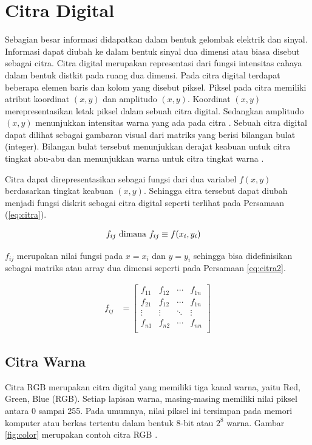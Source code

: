 \section{Citra Digital}
Sebagian besar informasi didapatkan dalam bentuk gelombak elektrik dan sinyal. Informasi dapat diubah ke dalam bentuk sinyal dua dimensi atau biasa disebut sebagai citra. Citra digital merupakan representasi dari fungsi intensitas cahaya dalam bentuk distkit pada ruang dua dimensi. Pada citra digital terdapat beberapa elemen baris dan kolom yang disebut piksel. Piksel pada citra memiliki atribut koordinat $(x,y)$ dan amplitudo $(x,y)$. Koordinat $(x,y)$ merepresentasikan letak piksel dalam sebuah citra digital. Sedangkan amplitudo $(x,y)$ menunjukkan intensitas warna yang ada pada citra \citep{Ratna2020}. Sebuah citra digital dapat dilihat sebagai gambaran visual dari matriks yang berisi bilangan bulat (integer). Bilangan bulat tersebut menunjukkan derajat keabuan untuk citra tingkat abu-abu dan menunjukkan warna untuk citra tingkat warna \citep{Blackledge2005,Septiaji2018}.

Citra dapat direpresentasikan sebagai fungsi dari dua variabel $f(x,y)$ berdasarkan tingkat keabuan $(x,y)$. Sehingga citra tersebut dapat diubah menjadi fungsi diskrit sebagai citra digital seperti terlihat pada Persamaan (\ref{eq:citra}).

\begin{align}
    f_{ij} \textnormal{ dimana } f_{ij} &\equiv f(x_i, y_i)
    \label{eq:citra}
\end{align}

$f_{ij}$ merupakan nilai fungsi pada $x=x_i$ dan $y=y_i$ sehingga bisa didefinisikan sebagai matriks atau array dua dimensi seperti pada Persamaan \ref{eq:citra2}.

\begin{align}
    f_{ij} &=
    \begin{bmatrix}
        f_{11} &f_{12} &\cdots &f_{1n}\\
        f_{21} &f_{12} &\cdots &f_{1n}\\
        \vdots &\vdots &\ddots &\vdots\\
        f_{n1} &f_{n2} &\cdots &f_{nn}\\
    \end{bmatrix}
    \label{eq:citra2}
\end{align}

    \subsection{Citra Warna}
    Citra RGB merupakan citra digital yang memiliki tiga kanal warna, yaitu Red, Green, Blue (RGB). Setiap lapisan warna, masing-masing memiliki nilai piksel antara 0 sampai 255. Pada umumnya, nilai piksel ini tersimpan pada memori komputer atau berkas tertentu dalam bentuk 8-bit atau $2^8$ warna. Gambar \ref{fig:color} merupakan contoh citra RGB \citep{Septiaji2018}.

